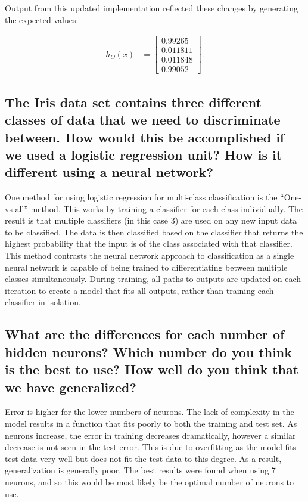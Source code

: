 \documentclass[titlepage]{scrartcl}
\begin{document}
Output from this updated implementation reflected these changes by generating
the expected values:

\begin{align}
h_\Theta(x) &= \begin{bmatrix}
            0.99265 \\
            0.011811 \\
            0.011848 \\
            0.99052
         \end{bmatrix}.
\end{align}

\subsection{The Iris data set contains three different classes of data that we
need to discriminate between. How would this be accomplished if we used a
logistic regression unit? How is it different using a neural network?}
One method for using logistic regression for multi-class classification is the
``One-vs-all'' method. This works by training a classifier for each class
individually. The result is that multiple classifiers (in this case 3) are used
on any new input data to be classified. The data is then classified based on
the classifier that returns the highest probability that the input is of the
class associated with that classifier.~\parencite{ng2014}\\
This method contrasts the neural network approach to classification as a single
neural network is capable of being trained to differentiating between multiple classes
simultaneously. During training, all paths to outputs are updated on each
iteration to create a model that fits all outputs, rather than training each
classifier in isolation.

\subsection{What are the differences for each number of hidden neurons? Which
number do you think is the best to use? How well do you think that we have
generalized?}
Error is higher for the lower numbers of neurons. The lack of complexity in the
model results in a function that fits poorly to both the training and test set.
As neurons increase, the error in training decreases dramatically, however a
similar decrease is not seen in the test error. This is due to overfitting as
the model fits test data very well but does not fit the test data to this
degree. As a result, generalization is generally poor. The best results were
found when using 7 neurons, and so this would be most likely be the optimal
number of neurons to use.
\end{document}
